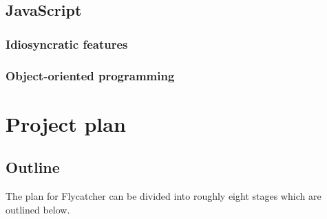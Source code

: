 \documentclass[a4paper,11pt,titlepage]{report}
\begin{document}
\section{JavaScript}
\subsection{Idiosyncratic features}


\subsection{Object-oriented programming}

\chapter{Project plan}

\section{Outline}
\label{sec:project_outline}
The plan for Flycatcher can be divided into roughly eight stages which are outlined below.
\end{document}
